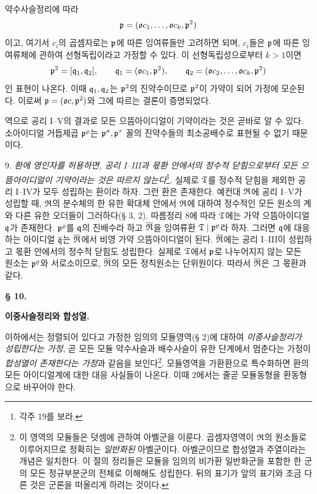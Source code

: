 약수사슬정리에 따라
\[
        \mathfrak{p}=(\mathfrak{o} c_1,\ldots,\mathfrak{o} c_k,\mathfrak{p}^2)
\]
이고, 여기서 \(c_i\)의 곱셈자로는 \(\mathfrak{p}\)에 따른 잉여류들만 고려하면 되며, \(c_i\)들은 \(\mathfrak{p}\)에 따른 잉여류체에 관하여 선형독립이라고 가정할 수 있다. 이 선형독립성으로부터 \(k>1\)이면
\[
        \mathfrak{p}^2=[\mathfrak{q}_1,\mathfrak{q}_2],\qquad
        \mathfrak{q}_1=(\mathfrak{o} c_1,\mathfrak{p}^2),\qquad
        \mathfrak{q}_2=(\mathfrak{o} c_2,\ldots,\mathfrak{o} c_k,\mathfrak{p}^2)
\]
인 표현이 나온다. 이때 \(\mathfrak{q}_1,\mathfrak{q}_2\)는 \(\mathfrak{p}^2\)의 진약수이므로 \(\mathfrak{p}^2\)이 가약이 되어 가정에 모순된다. 이로써 \(\mathfrak{p}=(\mathfrak{o} c,\mathfrak{p}^2)\)와 그에 따르는 결론이 증명되었다.

역으로 공리 I--V의 결과로 모든 으뜸아이디얼이 기약이라는 것은 곧바로 알 수 있다. 소아이디얼 거듭제곱 \(\mathfrak{p}^\varrho\)는 \(\mathfrak{p}^\sigma,\mathfrak{p}^\tau\) 꼴의 진약수들의 최소공배수로 표현될 수 없기 때문이다.

9. \emph{환에 영인자를 허용하면, 공리 I--III과 몫환 안에서의 정수적 닫힘으로부터 모든 으뜸아이디얼이 기약이라는 것은 따르지 않는다}\footnote{각주 19를 보라.}. 실제로 \(\mathfrak{T}\)를 정수적 닫힘을 제외한 공리 I--IV가 모두 성립하는 환이라 하자. 그런 환은 존재한다. 예컨대 \(\mathfrak{R}\)에 공리 I--V가 성립할 때, \(\mathfrak{R}\)의 분수체의 한 유한 확대체 안에서 \(\mathfrak{R}\)에 대하여 정수적인 모든 원소의 계와 다른 유한 오더들이 그러하다(§ 3, 2). 따름정리 8에 따라 \(\mathfrak{T}\)에는 가약 으뜸아이디얼 \(\mathfrak{q}\)가 존재한다. \(\mathfrak{p}^\varrho\)를 \(\mathfrak{q}\)의 진배수라 하고 \(\overline{\mathfrak{R}}\)을 잉여류환 \(\mathfrak{T}\mid\mathfrak{p}^\varrho\)라 하자. 그러면 \(\mathfrak{q}\)에 대응하는 아이디얼 \(\overline{\mathfrak{q}}\)는 \(\overline{\mathfrak{R}}\)에서 비영 가약 으뜸아이디얼이 된다. \(\overline{\mathfrak{R}}\)에는 공리 I--III이 성립하고 몫환 안에서의 정수적 닫힘도 성립한다. 실제로 \(\mathfrak{T}\)에서 \(\mathfrak{p}\)로 나누어지지 않는 모든 원소는 \(\mathfrak{p}^\varrho\)와 서로소이므로, \(\overline{\mathfrak{R}}\)의 모든 정칙원소는 단위원이다. 따라서 \(\overline{\mathfrak{R}}\)은 그 몫환과 같다.

\begin{center}
{\bfseries\large § 10.\par}
\vspace{0.35em}
{\bfseries\large 이중사슬정리와 합성열.\par}
\end{center}

이하에서는 정렬되어 있다고 가정한 임의의 모듈영역(§ 2)에 대하여 \emph{이중사슬정리가 성립한다는 가정}, 곧 모든 모듈 약수사슬과 배수사슬이 유한 단계에서 멈춘다는 가정이 \emph{합성열이 존재한다는 가정}과 같음을 보인다\footnote{이 영역의 모듈들은 덧셈에 관하여 아벨군을 이룬다. 곱셈자영역이 \(\mathfrak{R}\)의 원소들로 이루어지므로 정확히는 \emph{일반화된} 아벨군이다. 아벨군이므로 합성열과 주열이라는 개념은 일치한다. 이 절의 정리들은 \glqq{}모듈\grqq{}을 임의의 비가환 일반화군을 포함한 한 군의 모든 정규부분군의 전체로 이해해도 성립한다. 뒤의 표기가 앞의 표기와 조금 다른 것은 군론을 떠올리게 하려는 것이다.}. 모듈영역을 가환환으로 특수화하면 환의 모든 아이디얼계에 대한 대응 사실들이 나온다. 이때 2에서는 줄곧 모듈동형을 환동형으로 바꾸어야 한다.

